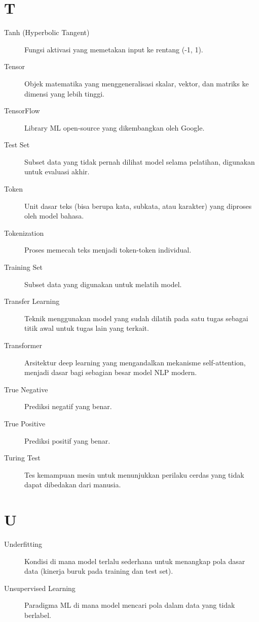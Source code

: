 \section*{T}
\begin{description}
    \item[Tanh (Hyperbolic Tangent)] Fungsi aktivasi yang memetakan input ke rentang (-1, 1).
    \item[Tensor] Objek matematika yang menggeneralisasi skalar, vektor, dan matriks ke dimensi yang lebih tinggi.
    \item[TensorFlow] Library ML open-source yang dikembangkan oleh Google.
    \item[Test Set] Subset data yang tidak pernah dilihat model selama pelatihan, digunakan untuk evaluasi akhir.
    \item[Token] Unit dasar teks (bisa berupa kata, subkata, atau karakter) yang diproses oleh model bahasa.
    \item[Tokenization] Proses memecah teks menjadi token-token individual.
    \item[Training Set] Subset data yang digunakan untuk melatih model.
    \item[Transfer Learning] Teknik menggunakan model yang sudah dilatih pada satu tugas sebagai titik awal untuk tugas lain yang terkait.
    \item[Transformer] Arsitektur deep learning yang mengandalkan mekanisme self-attention, menjadi dasar bagi sebagian besar model NLP modern.
    \item[True Negative] Prediksi negatif yang benar.
    \item[True Positive] Prediksi positif yang benar.
    \item[Turing Test] Tes kemampuan mesin untuk menunjukkan perilaku cerdas yang tidak dapat dibedakan dari manusia.
\end{description}

\section*{U}
\begin{description}
    \item[Underfitting] Kondisi di mana model terlalu sederhana untuk menangkap pola dasar data (kinerja buruk pada training dan test set).
    \item[Unsupervised Learning] Paradigma ML di mana model mencari pola dalam data yang tidak berlabel.
\end{description}

